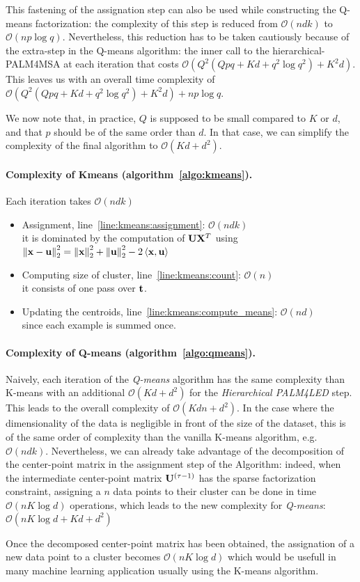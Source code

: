 This fastening of the assignation step can also be used while constructing the Q-means factorization: the complexity of this step is reduced from $\mathcal{O}(ndk)$ to $\mathcal{O}(np \log q)$. Nevertheless, this reduction has to be taken cautiously because of the extra-step in the Q-means algorithm: the inner call to the hierarchical-PALM4MSA at each iteration that costs $\mathcal{O}(Q^2(Qpq + Kd + q^2\log q^2) + K^2d)$. This leaves us with an overall time complexity of $\mathcal{O}(Q^2(Qpq + Kd + q^2\log q^2) + K^2d) + np \log q$. 

We now note that, in practice, $Q$ is supposed to be small compared to $K$ or $d$, and that $p$ should be of the same order than $d$. In that case, we can simplify the complexity of the final algorithm to $\mathcal{O}(Kd + d^2)$.

\paragraph{Complexity of Kmeans (algorithm~\ref{algo:kmeans}).}
Each iteration takes $\mathcal{O}\left (ndk\right )$
\begin{itemize}
\item Assignment, line~\ref{line:kmeans:assignment}: $\mathcal{O}\left (ndk\right )$\\
it is dominated by the computation of ${\mathbf{U}} {\mathbf{X}}^T$ using $\left \|{\mathbf{x}}-{\mathbf{u}}\right \|_2^2=\left \|{\mathbf{x}}\right \|_2^2+\left \|{\mathbf{u}}\right \|_2^2-2\left <{\mathbf{x}}, {\mathbf{u}}\right >$
\item Computing size of cluster, line~\ref{line:kmeans:count}: $\mathcal{O}\left (n \right )$\\
it consists of one pass over ${\mathbf{t}}$.
\item Updating the centroids, line~\ref{line:kmeans:compute_means}: $\mathcal{O}\left (nd\right )$\\
since each example is summed once.
\end{itemize}

\paragraph{Complexity of Q-means (algorithm~\ref{algo:qmeans}).}

Naively, each iteration of the \textit{Q-means} algorithm has the same complexity than K-means with an additional $\mathcal{O}(Kd + d^2)$ for the \textit{Hierarchical PALM4LED} step. This leads to the overall complexity of $\mathcal{O}(Kdn + d^2)$. In the case where the dimensionality of the data is negligible in front of the size of the dataset, this is of the same order of complexity than the vanilla K-means algorithm, e.g. $\mathcal{O}(ndk)$. Nevertheless, we can already take advantage of the decomposition of the center-point matrix in the assignment step of the Algorithm: indeed, when the intermediate center-point matrix ${\mathbf{U}}^{(\tau-1)}$ has the sparse factorization constraint, assigning a $n$ data points to their cluster can be done in time $\mathcal{O}(n K \log d)$ operations, which leads to the new complexity for \textit{Q-means}: $\mathcal{O}(nK\log d + Kd + d^2)$

Once the decomposed center-point matrix has been obtained, the assignation of a new data point to a cluster becomes $\mathcal{O}(nK\log d)$ which would be usefull in many machine learning application usually using the K-means algorithm.
